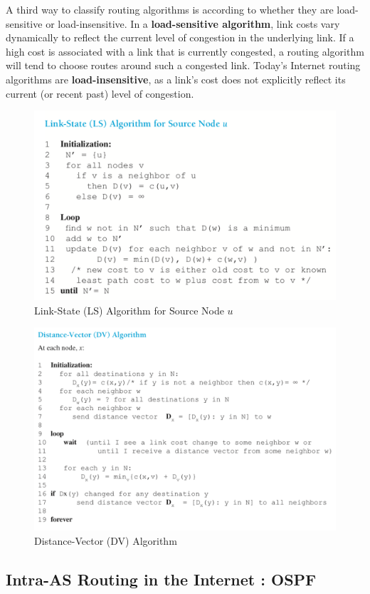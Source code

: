 \documentclass[11pt]{article}
\begin{document}
A third way to classify routing algorithms is according to whether they are load-sensitive or load-insensitive. In a \textbf{load-sensitive algorithm}, link costs vary dynamically to reflect the current level of congestion in the underlying link. If a high cost is associated with a link that is currently congested, a routing algorithm will tend to choose routes around such a congested link. Today’s Internet routing algorithms are \textbf{load-insensitive}, as a link’s cost does not explicitly reflect its current (or recent past) level of congestion.

\begin{figure}[h]
	\centering
	\includegraphics[width=0.8\linewidth]{images/ls.png}
	\caption{Link-State (LS) Algorithm for Source Node $u$}
	\label{fig:ls}
\end{figure}

\begin{figure}[h]
	\centering
	\includegraphics[width=0.8\linewidth]{images/dv.png}
	\caption{Distance-Vector (DV) Algorithm}
	\label{fig:dv}
\end{figure}

\subsection{Intra-AS Routing in the Internet : OSPF}
\end{document}
